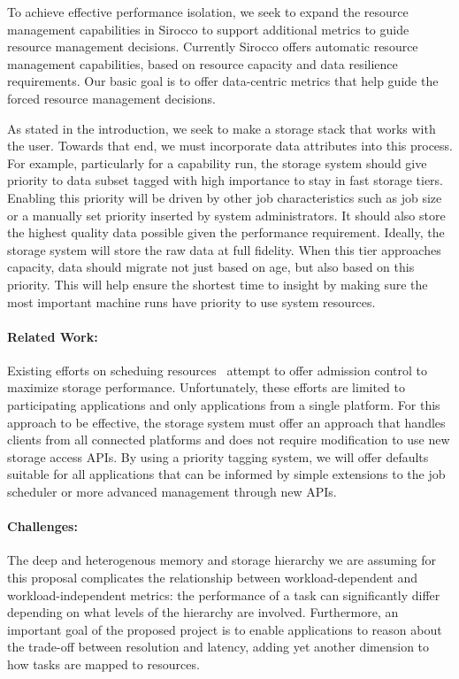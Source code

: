 To achieve effective performance isolation, we seek to expand the resource management
capabilities in Sirocco to support additional metrics to guide resource management
decisions. Currently Sirocco offers automatic resource management capabilities,
based on resource capacity and data resilience requirements. 
 Our basic goal is to offer data-centric metrics that help guide the
forced resource management decisions.

As stated in the introduction, we seek to make a storage stack that works with
the user. Towards that end, we must incorporate data attributes into this
process. For example, particularly for a capability run, the storage system
should give priority to data subset tagged with high importance to stay in fast
storage tiers. Enabling this priority will be driven by other job
characteristics such as job size or a manually set priority inserted by system
administrators. It should also store the highest quality data possible given
the performance requirement. Ideally, the storage system will store the raw
data at full fidelity. When this tier approaches capacity, data should migrate
not just based on age, but also based on this priority. This will help ensure
the shortest time to insight by making sure the most important machine runs
have priority to use system resources.

\paragraph{Related Work:} Existing efforts on scheduing resources~\cite{io-cop,dorier} attempt to offer
admission control to maximize storage performance. Unfortunately, these efforts
are limited to participating applications and only applications from a single
platform. For this approach to be effective, the storage system must offer an
approach that handles clients from all connected platforms and does not
require modification to use new storage access APIs. By using a priority
tagging system, we will offer defaults suitable for all applications that can
be informed by simple extensions to the job scheduler or more advanced
management through new APIs.

\paragraph{Challenges:} The deep and heterogenous memory and storage
hierarchy we are assuming for this proposal complicates the
relationship between workload-dependent and workload-independent
metrics: the performance of a task can significantly differ depending
on what levels of the hierarchy are involved. Furthermore, an
important goal of the proposed project is to enable applications
to reason about the trade-off between resolution and latency, adding
yet another dimension to how tasks are mapped to resources.


